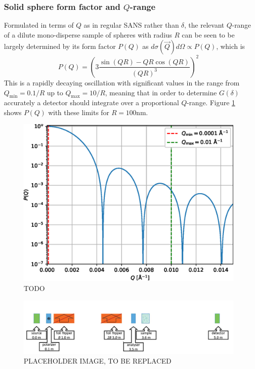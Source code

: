 \documentclass{article}
\begin{document}
\newpage

\subsubsection{Solid sphere form factor and $Q$-range}
Formulated in terms of $Q$ as in regular SANS rather than $\delta$, the relevant $Q$-range of a dilute mono-disperse sample of spheres with radius $R$ can be seen to be largely determined by its form factor $P(Q)$ as $d\sigma(\vec{Q})d\Omega\propto P(Q)$, which is \cite{rekveldt1996}
\begin{equation}
	P(Q) = \left(3\frac{\sin(QR) - QR\cos(QR)}{\left(QR\right)^3}\right)^2\label{eq:sample-form-factor}
\end{equation}
This is a rapidly decaying oscillation with significant values in the range from $Q_{\text{min}} = 0.1/R$ up to $Q_{\text{max}} = 10/R$, meaning that in order to determine $G(\delta)$ accurately a detector should integrate over a proportional $Q$-range.  Figure \ref{fig:analytical-P} shows $P(Q)$ with these limits for $R = 100\unit{\nano\meter}$.  

\begin{figure}
	\centering
	\includegraphics[width=0.5\linewidth]{analytical-P-log}
	\caption{TODO}
	\label{fig:analytical-P}
\end{figure}
\newpage
\begin{figure}
	\centering
	\includegraphics[width=\linewidth]{config-placeholder}
	\caption{PLACEHOLDER IMAGE, TO BE REPLACED}
	\label{fig:instrument-config}
\end{figure}
\end{document}
